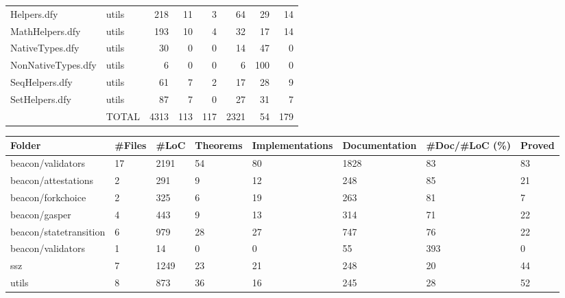 \documentclass[a4paper, 12pt]{article}
\begin{document}
\begin{tabular}{llrrrrrr}
             Helpers.dfy &                   utils &   218 &        11 &                3 &             64 &             29 &      14 \\
         MathHelpers.dfy &                   utils &   193 &        10 &                4 &             32 &             17 &      14 \\
         NativeTypes.dfy &                   utils &    30 &         0 &                0 &             14 &             47 &       0 \\
      NonNativeTypes.dfy &                   utils &     6 &         0 &                0 &              6 &            100 &       0 \\
          SeqHelpers.dfy &                   utils &    61 &         7 &                2 &             17 &             28 &       9 \\
          SetHelpers.dfy &                   utils &    87 &         7 &                0 &             27 &             31 &       7 \\
                         &                   TOTAL &  4313 &       113 &              117 &           2321 &             54 &     179 \\
\bottomrule
\end{tabular}

\vspace{2em}
\begin{tabular}{llllllll}
\toprule
                 Folder & \#Files &  \#LoC & Theorems & Implementations & Documentation & \#Doc/\#LoC (\%) & Proved \\
\midrule
      beacon/validators &     17 &  2191 &       54 &              80 &          1828 &            83 &     83 \\
    beacon/attestations &      2 &   291 &        9 &              12 &           248 &            85 &     21 \\
      beacon/forkchoice &      2 &   325 &        6 &              19 &           263 &            81 &      7 \\
          beacon/gasper &      4 &   443 &        9 &              13 &           314 &            71 &     22 \\
 beacon/statetransition &      6 &   979 &       28 &              27 &           747 &            76 &     22 \\
      beacon/validators &      1 &    14 &        0 &               0 &            55 &           393 &      0 \\
                    ssz &      7 &  1249 &       23 &              21 &           248 &            20 &     44 \\
                  utils &      8 &   873 &       36 &              16 &           245 &            28 &     52 \\
\bottomrule
\end{tabular}
\end{document}
